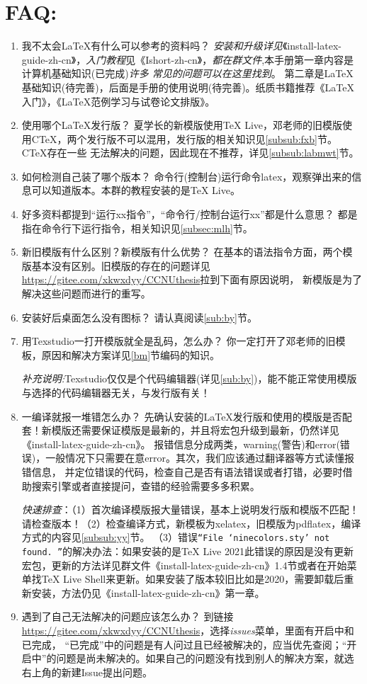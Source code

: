 \section*{FAQ:}
\begin{enumerate}
  \item 我不太会\LaTeX{}有什么可以参考的资料吗？\,\,\emph{安装和升级详见}《install-latex-guide-zh-cn》，\emph{入门教程}见《Ishort-zh-cn》，\emph{都在群文件},本手册第一章内容是计算机基础知识(已完成)\emph{许多
  常见的问题可以在这里找到}。
  第二章是\LaTeX{}基础知识(待完善)，后面是手册的使用说明(待完善)。纸质书籍推荐《LaTeX入门》，《LaTeX范例学习与试卷论文排版》。
  \item 使用哪个\LaTeX{}发行版？\,\,夏学长的新模版使用\TeX{} Live，邓老师的旧模版使用C\TeX{}，两个发行版不可以混用，发行版的相关知识见\ref{subsub:fxb}节。C\TeX{}存在一些
        无法解决的问题，因此现在不推荐，详见\ref{subsub:labmwt}节。
  \item 如何检测自己装了哪个版本？\,\,命令行(控制台)运行命令latex，观察弹出来的信息可以知道版本。本群的教程安装的是\TeX{} Live。
  \item 好多资料都提到“运行xx指令”，“命令行/控制台运行xx”都是什么意思？\,\,都是指在命令行下运行指令，相关知识见\ref{subsec:mlh}节。
  \item 新旧模版有什么区别？新模版有什么优势？\,\,在基本的语法指令方面，两个模版基本没有区别。旧模版的存在的问题详见\url{https://gitee.com/xkwxdyy/CCNUthesis}拉到下面有原因说明，
        新模版是为了解决这些问题而进行的重写。
  \item 安装好后桌面怎么没有图标？\,\,请认真阅读\ref{sub:by}节。
  \item 用Texstudio一打开模版就全是乱码，怎么办？\,\,你一定打开了邓老师的旧模板，原因和解决方案详见\ref{bm}节编码的知识。
  
        \emph{补充说明:}Texstudio仅仅是个代码编辑器(详见\ref{sub:by})，能不能正常使用模版与选择的代码编辑器无关，与发行版有关！
  \item 一编译就报一堆错怎么办？\,\,先确认安装的\LaTeX{}发行版和使用的模版是否配套！新模版还需要保证模版是最新的，并且将宏包升级到最新，仍然详见《install-latex-guide-zh-cn》。
  报错信息分成两类，warning(警告)和error(错误)，一般情况下只需要在意error。其次，我们应该通过翻译器等方式读懂报错信息，
       并定位错误的代码，检查自己是否有语法错误或者打错，必要时借助搜索引擎或者直接提问，查错的经验需要多多积累。

       \emph{快速排查}：（1）首次编译模版报大量错误，基本上说明发行版和模版不匹配！请检查版本！（2）检查编译方式，新模板为xelatex，旧模版为pdflatex，编译方式的内容见\ref{subsub:yy}节。
       （3）错误\verb"“File ‘ninecolors.sty’ not found. ”"的解决办法：如果安装的是TeX Live 2021此错误的原因是没有更新宏包，更新的方法详见群文件《install-latex-guide-zh-cn》1.4节或者在开始菜单找TeX Live Shell来更新。如果安装了版本较旧比如是2020，需要卸载后重新安装，方法仍见《install-latex-guide-zh-cn》第一章。
  \item 遇到了自己无法解决的问题应该怎么办？\,\,到链接\url{https://gitee.com/xkwxdyy/CCNUthesis}，选择\emph{issues}菜单，里面有开启中和已完成，
        “已完成”中的问题是有人问过且已经被解决的，应当优先查阅；“开启中”的问题是尚未解决的。如果自己的问题没有找到别人的解决方案，就选右上角的新建Issue提出问题。
  

\end{enumerate}
